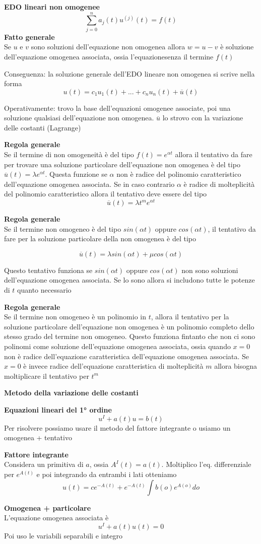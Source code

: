 \documentclass[12pt, a4paper]{article}
\begin{document}
\textbf{EDO lineari non omogenee}\[\sum^{n}_{j=0}a_{j}(t)u^{(j)}(t)=f(t)\]
\textbf{Fatto generale}\\Se $u$ e $v$ sono soluzioni dell'equazione non omogenea allora $w=u-v$ è soluzione
dell'equazione omogenea associata, ossia l'equazionesenza il termine $f(t)$

Conseguenza: la soluzione generale dell'EDO lineare non omogenea si scrive nella forma
\[u(t)=c_{1}u_{1}(t)+...+c_{n}u_{n}(t)+\overline{u}(t)\]

Operativamente: trovo la base dell'equazioni omogenee associate, poi una soluzione qualsiasi dell'equazione
non omogenea. $\overline{u}$ lo strovo con la variazione delle costanti (Lagrange)

\textbf{Regola generale}\\Se il termine di non omogeneità è del tipo $f(t)=e^{\alpha t}$ allora il tentativo
da fare per trovare una soluzione particolare dell'equazione non omogenea è del tipo $\overline{u}(t)=\lambda
    e^{\alpha t}$. Questa funzione se $\alpha$ non è radice del polinomio caratteristico dell'equazione omogenea
associata. Se in caso contrario $\alpha$ è radice di molteplicità del polinomio caratteristico allora il
tentativo deve essere del tipo \[\overline{u}(t)=\lambda t^{m}e^{\alpha t}\]

\textbf{Regola generale}\\ Se il termine non omogeneo è del tipo $sin(\alpha t)$ oppure $cos(\alpha t)$, il tentativo
da fare per la soluzione particolare della non omogenea è del tipo

\[\overline{u}(t)=\lambda sin(\alpha t)+\mu cos(\alpha t)\]

Questo tentativo funziona se $sin(\alpha t)$ oppure $cos(\alpha t)$ non sono soluzioni dell'equazione omogenea
associata. Se lo sono allora si includono tutte le potenze di $t$ quanto necessario

\textbf{Regola generale}\\Se il termine non omogeneo è un polinomio in $t$, allora il tentativo per la soluzione
particolare dell'equazione non omogenea è un polinomio completo dello stesso grado del termine non omogeneo.
Questo funziona fintanto che non ci sono polinomi come soluzione dell'equazione omogenea associata, ossia quando
$x=0$ non è radice dell'equazione caratteristica dell'equazione omogenea associata. Se $x=0$ è invece radice
dell'equazione caratteristica di molteplicità $m$ allora bisogna moltiplicare il tentativo per $t^{m}$

\textbf{Metodo della variazione delle costanti}

\textbf{Equazioni lineari del 1° ordine}\[u^{I}+a(t)u=b(t)\]Per risolvere possiamo usare il metodo del fattore
integrante o usiamo un omogenea + tentativo

\textbf{Fattore integrante}\\Considera un primitiva di $a$, ossia $A^{I}(t)=a(t)$. Moltiplico l'eq. differenziale
per $e^{A(t)}$ e poi integrando da entrambi i lati otteniamo
\[ u(t)=ce^{-A(t)}+ e^{-A(t)}\int b(o)e^{A(o)}do\]

\textbf{Omogenea + particolare}\\L'equazione omogenea associata è \[u^{I}+a(t)u(t)=0\]Poi uso le variabili
separabili e integro
\end{document}
